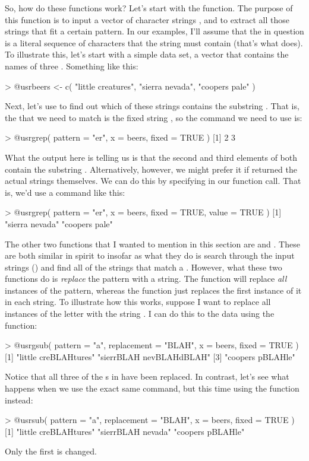 So, how do these functions work? Let's start with the  function. The purpose of this function is to input a  vector of character strings , and to extract all those strings that fit a certain pattern. In our examples, I'll assume that the  in question is a literal sequence of characters that the string must contain (that's what  does). To illustrate this, let's start with a simple data set, a vector that contains the names of three . Something like this:
\begin{rblock1}
> @usr{beers <- c( "little creatures", "sierra nevada", "coopers pale" )}
\end{rblock1}
Next, let's use  to find out which of these strings contains the substring . That is, the  that we need to match is the fixed string , so the command we need to use is:
\begin{rblock1}
> @usr{grep( pattern = "er", x = beers, fixed = TRUE )}
[1] 2 3
\end{rblock1}
What the output here is telling us is that the second and third elements of  both contain the substring . Alternatively, however, we might prefer it if  returned the actual strings themselves. We can do this by specifying  in our function call. That is, we'd use a command like this:
\begin{rblock1}
> @usr{grep( pattern = "er", x = beers, fixed = TRUE, value = TRUE )}
[1] "sierra nevada" "coopers pale"
\end{rblock1}


The other two functions that I wanted to mention in this section are  and . These are both similar in spirit to  insofar as what they do is search through the input strings () and find all of the strings that match a . However, what these two functions do is {\it replace} the pattern with a  string. The  function will replace {\it all} instances of the pattern, whereas the  function just replaces the first instance of it in each string. To illustrate how this works, suppose I want to replace all instances of the letter  with the string . I can do this to the  data using the  function:
\begin{rblock1}
> @usr{gsub( pattern = "a", replacement = "BLAH", x = beers, fixed = TRUE )}
[1] "little creBLAHtures"    "sierrBLAH nevBLAHdBLAH"
[3] "coopers pBLAHle" 
\end{rblock1}
Notice that all three of the s in  have been replaced. In contrast, let's see what happens when we use the exact same command, but this time using the  function instead:
\begin{rblock1}
> @usr{sub( pattern = "a", replacement = "BLAH", x = beers, fixed = TRUE )}
[1] "little creBLAHtures" "sierrBLAH nevada"    "coopers pBLAHle"  
\end{rblock1}
Only the first  is changed.

